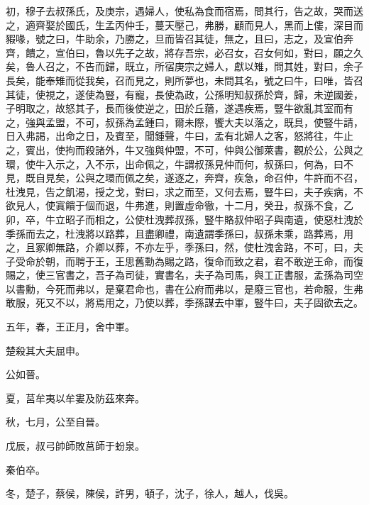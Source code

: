 \begin{pinyinscope}
初，穆子去叔孫氏，及庚宗，遇婦人，使私為食而宿焉，問其行，告之故，哭而送之，適齊娶於國氏，生孟丙仲壬，蔓天壓己，弗勝，顧而見人，黑而上僂，深目而豭喙，號之曰，牛助余，乃勝之，旦而皆召其徒，無之，且曰，志之，及宣伯奔齊，饋之，宣伯曰，魯以先子之故，將存吾宗，必召女，召女何如，對曰，願之久矣，魯人召之，不告而歸，既立，所宿庚宗之婦人，獻以雉，問其姓，對曰，余子長矣，能奉雉而從我矣，召而見之，則所夢也，未問其名，號之曰牛，曰唯，皆召其徒，使視之，遂使為豎，有寵，長使為政，公孫明知叔孫於齊，歸，未逆國姜，子明取之，故怒其子，長而後使逆之，田於丘蕕，遂遇疾焉，豎牛欲亂其室而有之，強與孟盟，不可，叔孫為孟鍾曰，爾未際，饗大夫以落之，既具，使豎牛請，日入弗謁，出命之日，及賓至，聞鍾聲，牛曰，孟有北婦人之客，怒將往，牛止之，賓出，使拘而殺諸外，牛又強與仲盟，不可，仲與公御萊書，觀於公，公與之環，使牛入示之，入不示，出命佩之，牛謂叔孫見仲而何，叔孫曰，何為，曰不見，既自見矣，公與之環而佩之矣，遂逐之，奔齊，疾急，命召仲，牛許而不召，杜洩見，告之飢渴，授之戈，對曰，求之而至，又何去焉，豎牛曰，夫子疾病，不欲見人，使寘饋于個而退，牛弗進，則置虛命徹，十二月，癸丑，叔孫不食，乙卯，卒，牛立昭子而相之，公使杜洩葬叔孫，豎牛賂叔仲昭子與南遺，使惡杜洩於季孫而去之，杜洩將以路葬，且盡卿禮，南遺謂季孫曰，叔孫未乘，路葬焉，用之，且冢卿無路，介卿以葬，不亦左乎，季孫曰，然，使杜洩舍路，不可，曰，夫子受命於朝，而聘于王，王思舊勳為賜之路，復命而致之君，君不敢逆王命，而復賜之，使三官書之，吾子為司徒，實書名，夫子為司馬，與工正書服，孟孫為司空以書勳，今死而弗以，是棄君命也，書在公府而弗以，是廢三官也，若命服，生弗敢服，死又不以，將焉用之，乃使以葬，季孫謀去中軍，豎牛曰，夫子固欲去之。

五年，春，王正月，舍中軍。

楚殺其大夫屈申。

公如晉。

夏，莒牟夷以牟婁及防茲來奔。

秋，七月，公至自晉。

戊辰，叔弓帥師敗莒師于蚡泉。

秦伯卒。

冬，楚子，蔡侯，陳侯，許男，頓子，沈子，徐人，越人，伐吳。


\end{pinyinscope}
